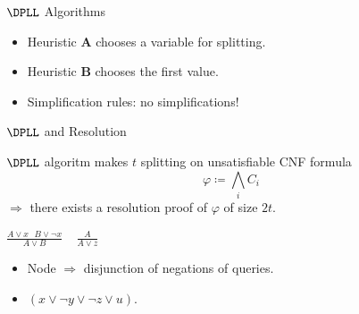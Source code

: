 \begin{frame}{$\DPLL$ Algorithms}

    \begin{center}
                
    \end{center}

    
	\pause
    \pause
    \pause
    \pause
    \pause
    \begin{itemize}
        \item Heuristic $\mathbf{A}$ chooses a variable for splitting.
    	\pause
	    \item Heuristic $\mathbf{B}$ chooses the first value.
    	\pause
    	\item Simplification rules: \alert{no simplifications!}
    \end{itemize}
\end{frame}

\begin{frame}{$\DPLL$ and Resolution}
    
    \begin{theorem}
        $\DPLL$ algoritm makes $t$ splitting on \alert{unsatisfiable} CNF formula
        $$\varphi \coloneqq \bigwedge\limits_i C_i$$
        $\Rightarrow$ there exists a resolution proof of $\varphi$ of size $2t$.
    \end{theorem}

    \pause

    \begin{minipage}{0.58\linewidth}
        \centering
        
    \end{minipage}
    \pause
    \begin{minipage}{0.4\linewidth}
        \centering
        $\frac{A \lor x ~~~ B \lor \neg x}{A \lor B} ~~~~~ \frac{A}{A \lor z}$
        \begin{itemize}
            \item Node $\Rightarrow$ disjunction of negations of queries.
            \item $(x \lor \neg y \lor \neg z \lor u)$.
        \end{itemize}
    \end{minipage}

\end{frame}

